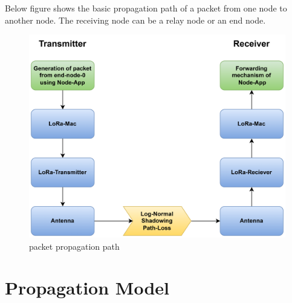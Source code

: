 Below figure shows the basic propagation path of a packet from one node to another node. The receiving node can be a relay node or an end node.
\newpage
            \begin{figure}[h!]
                \centering
                \includegraphics[width=0.7\columnwidth]{images/packet propagation path.jpg}
                \caption{packet propagation path}
                \label{fig:packet propagation path}
            \end{figure}


 




\section{Propagation Model}
\label{ch:Propagation_model}

